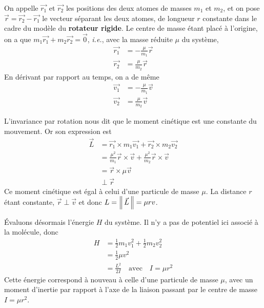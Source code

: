         On appelle $\vec{r_1}$ et $\vec{r_2}$ les positions des deux atomes de masses $m_1$ et $m_2$, et on pose $\vec{r} = \vec{r_2} - \vec{r_1}$ le vecteur séparant les deux atomes, de longueur $r$ constante dans le cadre du modèle du \textbf{rotateur rigide}. Le centre de masse étant placé à l’origine, on a que $m_1 \vec{r_1} + m_2 \vec{r_2} = \vec{0}$, \textit{i.e.}, avec la masse réduite $\mu$ du système,
        \begin{align*}
            \vec{r_1} &= - \frac{\mu}{m_1}\vec{r} \\
            \vec{r_2} &= \frac{\mu}{m_2}\vec{r}
        \end{align*}
        En dérivant par rapport au temps, on a de même 
        \begin{align*}
            \vec{v_1} &= - \frac{\mu}{m_1}\vec{v} \\
            \vec{v_2} &= \frac{\mu}{m_2}\vec{v}
        \end{align*}

        L’invariance par rotation nous dit que le moment cinétique est une constante du mouvement. Or son expression est
        \begin{align*}
            \vec{L} 
            &= \vec{r_1} \times m_1 \vec{v_1} + \vec{r_2} \times m_2 \vec{v_2} \\
            &= \frac{\mu^2}{m_1} \vec{r} \times \vec{v} + \frac{\mu^2}{m_2} \vec{r} \times \vec{v} \\
            &= \vec{r} \times \mu \vec{v} \\
            &\perp \vec{r}
        \end{align*}
        Ce moment cinétique est égal à celui d’une particule de masse $\mu$. La distance $r$ étant constante, $\vec{r} \perp \vec{v}$ et donc $L = \left\lVert \, \vec{L} \, \right\rVert = \mu r v$. 

        Évaluons désormais l’énergie $H$ du système. Il n’y a pas de potentiel ici associé à la molécule, donc 
        \begin{align*}
            H 
            &= \frac{1}{2} m_1 v_1^2 + \frac{1}{2} m_2 v_2^2 \\
            &= \frac{1}{2} \mu v^2 \\
            &= \frac{L^2}{2I} \quad \text{avec} \quad I = \mu r^2
        \end{align*}
        Cette énergie correspond à nouveau à celle d’une particule de masse $\mu$, avec un moment d’inertie par rapport à l’axe de la liaison passant par le centre de masse  $I = \mu r^2$.

